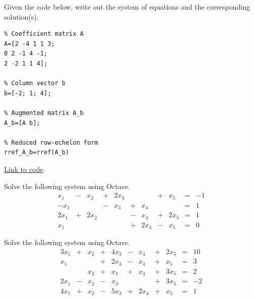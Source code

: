 \documentclass{ximera}
\begin{document}
\begin{problem}\label{prob_oct_sys_0}
    Given the code below, write out the system of equations and the corresponding solution(s).
 
    \begin{verbatim}
% Coefficient matrix A
A=[2 -4 1 1 3;
0 2 -1 4 -1;
2 -2 1 1 4];
 
% Column vector b
b=[-2; 1; 4];
 
% Augmented matrix A_b
A_b=[A b];
 
% Reduced row-echelon form
rref_A_b=rref(A_b)
    \end{verbatim}
 
\href{https://sagecell.sagemath.org/?z=eJxFjcEKwjAQRO-B_MNcCnoI2NpbySH4B16LFJtuNNA0sKTq57sVVBaGGeaxU-GUKYToIy0F6Vo4vuC0crZvYFrUcsdOqwMk1mhFJIlvPlV7kaRVJV_mNS14kC-ZMWo12t40Heruz7j1lmSFpt_OIKCI7R3GL3WmafXCcH4a8nea84KQOWnFTGHY8M3sxOzf0oYzHQ==&lang=octave&interacts=eJyLjgUAARUAuQ==}{Link to code}.   
\end{problem}
 
\begin{problem}\label{prob_oct_sys_1}
 Solve the following system using Octave.
 \begin{equation}
    \begin{array}{ccccccccccc}
          x_1 &- &x_2&+&2x_3&&&+&x_5&= &-1 \\
         -x_1&&&-&x_3&+&x_4&&&=&1\\
         2x_1&+&2x_2&&&-&x_4&+&2x_5&=&1\\
         x_1&&&&&+&2x_4&-&x_5&=&0
        \end{array}
        \end{equation}  
 
\end{problem}
 
\begin{problem}\label{prob_oct_sys_2}
    Solve the following system using Octave.
    \begin{equation}
       \begin{array}{ccccccccccc}
             3x_1&+&x_2&+&4x_3&-&x_4&+&2x_5&= &10 \\
            x_1&&&+&2x_3&-&x_4&+&x_5&=&3\\
            &&x_2&+&x_3&+&x_4&+&3x_5&=&2\\
            2x_1&-&x_2&-&x_3&&&+&3x_5&=&-2\\
            4x_1&+&x_2&-&5x_3&+&2x_4&+&x_5&=&1
        \end{array}
    \end{equation}  
\end{problem}
 
\end{document}

